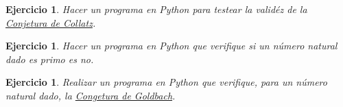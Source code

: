 \documentclass{article}
\newcounter{ejer}
\newtheorem{ejercicio}[ejer]{Ejercicio}}
\begin{document}
\begin{ejercicio} Hacer un programa en Python  para testear la valid\'ez de la \href{http://es.wikipedia.org/wiki/Conjetura_de_Collatz}{Conjetura de Collatz}.

\end{ejercicio}

\begin{ejercicio}
Hacer un programa en Python que verifique si un n\'umero natural dado es primo es no.
\end{ejercicio}

\begin{ejercicio}
Realizar un programa en Python que verifique, para un n\'umero natural dado, la \href{https://es.wikipedia.org/wiki/Conjetura_de_Goldbach}{Congetura de Goldbach}.

 
\end{ejercicio}
\end{document}
